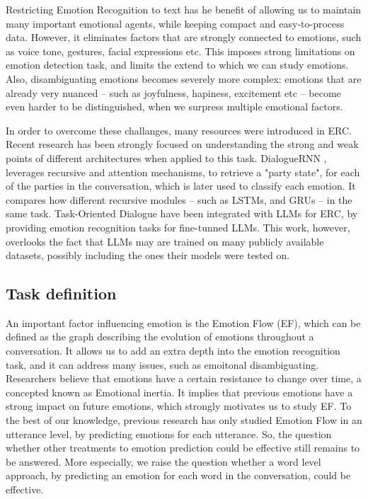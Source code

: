\documentclass[oneside, a4paper, onecolumn, 11pt]{article}
\begin{document}
Restricting Emotion Recognition to text has he benefit of allowing us to maintain many important emotional agents, while keeping compact and 
easy-to-process data. However, it eliminates factors that are strongly connected to emotions, such as voice tone, gestures, facial expressions 
etc. This imposes strong limitations on emotion detection task, and limits the extend to which we can study emotions. Also, disambiguating 
emotions becomes severely more complex: emotions that are already very nuanced -- such as joyfulness, hapiness, excitement etc -- become even 
harder to be distinguished, when we surpress multiple emotional factors.

In order to overcome these challanges, many resources were introduced in ERC. Recent research has been strongly focused on understanding the strong and 
weak points of different architectures when applied to this task. DialogueRNN \cite{majumder2019dialoguernnattentivernnemotion}, leverages recursive and 
attention mechanisms, to retrieve a "party state", for each of the parties in the conversation, which is later used to classify each emotion. 
It compares how different recursive modules -- such as LSTMs, and GRUs -- in the same task. Task-Oriented Dialogue \cite{stricker2024unifiedapproachemotiondetection} 
have been integrated with LLMs for ERC, by providing emotion recognition tasks for fine-tunned LLMs. This work, however, overlooks the fact that LLMs
may are trained on many publicly available datasets, possibly including the ones their models were tested on.

\subsection{Task definition}
An important factor influencing emotion is the Emotion Flow (EF), which can be defined as the graph describing the evolution of emotions 
throughout a conversation. It allows us to add an extra depth into the emotion recognition task, and it can address many issues, such as 
emoitonal disambiguating. Researchers believe that emotions have a certain resistance to change over time, a concepted known as Emotional inertia.
It implies that previous emotions have a strong impact on future emotions, which strongly motivates us to study EF. To the best of our knowledge, 
previous research has only studied Emotion Flow in an utterance level, by predicting emotions for each utterance. So, the question whether other 
treatments to emotion prediction could be effective still remains to be answered. More especially, we raise the question whether a word level approach, 
by predicting an emotion for each word in the conversation, could be effective.
\end{document}
